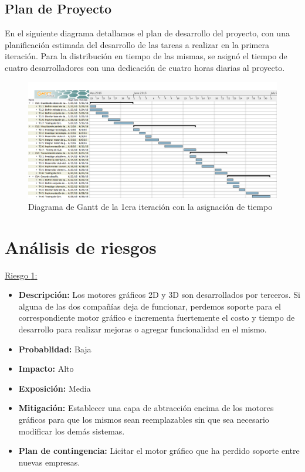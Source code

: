\documentclass[a4paper, 10pt, twoside]{article}
\newcommand{\riesgo}[7]{
  \underline{Riesgo {#1}:}
  \begin{itemize}   
    \item \textbf{Descripción:} {#2}
    \item \textbf{Probablidad:} {#3}
    \item \textbf{Impacto:} {#4}
    \item \textbf{Exposición:} {#5}
    \item \textbf{Mitigación:} {#6}
    \item \textbf{Plan de contingencia:} {#7}
  \end{itemize}
}
\begin{document}
\subsection{Plan de Proyecto}

En el siguiente diagrama detallamos el plan de desarrollo del proyecto, con una planificación estimada del desarrollo de las tareas a realizar en la primera iteración. Para la distribución en tiempo de las mismas, se asignó el tiempo de cuatro desarrolladores con una dedicación de cuatro horas diarias al proyecto.


\begin{landscape}
\begin{center}
  \begin{figure}[h!]
    \includegraphics[width=25cm]{gantt.png}
    \caption{Diagrama de Gantt de la 1era iteración con la asignación de tiempo}
    \label{fig:gantt}
  \end{figure}
\end{center}
\end{landscape}
\newpage


\section{Análisis de riesgos}
\label{riesgos:r1}
\riesgo{1}
    { Los motores gráficos 2D y 3D son desarrollados por terceros. Si alguna de las dos compañías deja de funcionar, perdemos soporte para el correspondiente motor gráfico e incrementa fuertemente el costo y tiempo de desarrollo para realizar mejoras o agregar funcionalidad en el mismo. }
    {Baja} %
    {Alto} %
    {Media} %
    {Establecer una capa de abtracción encima de los motores gráficos para que los mismos sean reemplazables sin que sea necesario modificar los demás sistemas.} %
    {Licitar el motor gráfico que ha perdido soporte entre nuevas empresas.} %
\end{document}
